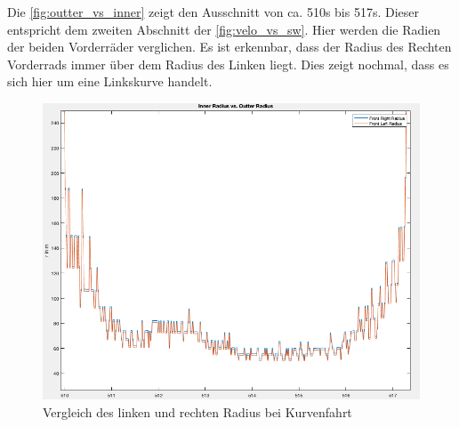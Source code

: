 \newpage
Die \autoref{fig:outter_vs_inner} zeigt den Ausschnitt von ca. 510s bis 517s. Dieser entspricht dem zweiten Abschnitt der \autoref{fig:velo_vs_sw}. Hier werden die Radien der beiden Vorderräder verglichen. Es ist erkennbar, dass der Radius des Rechten Vorderrads immer über dem Radius des Linken liegt. Dies zeigt nochmal, dass es sich hier um eine Linkskurve handelt.
\begin{figure}[h!]
	\centering
	\includegraphics[width=1\linewidth]{../Graphiken/outter_vs_inner}
	\caption{Vergleich des linken und rechten Radius bei Kurvenfahrt}
	\label{fig:outter_vs_inner}
\end{figure}
\cleardoublepage
\newpage



	
	

	
	
	
	